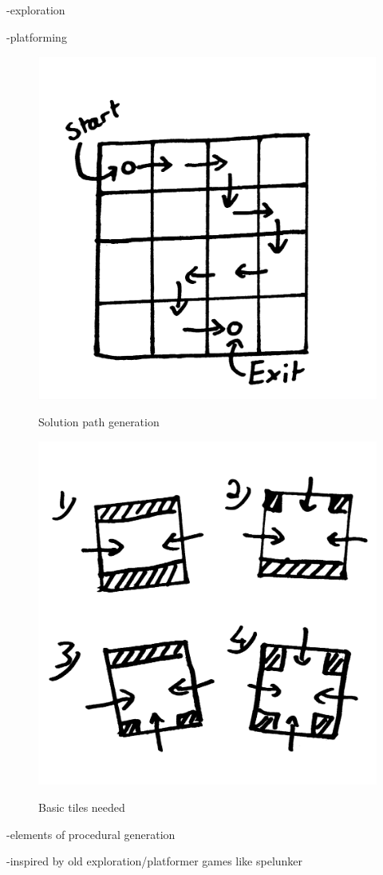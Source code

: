 -exploration

-platforming

\begin{figure}
\centering
\includegraphics[scale=0.2, trim = 0cm 0cm 0cm 0cm]{images/4x4}
\label{fig:4x}
\caption{Solution path generation}
\end{figure}

\begin{figure}
\centering
\includegraphics[scale=0.2, trim = 0cm 0cm 0cm 0cm]{images/16x16}
\label{fig:16x}
\caption{Basic tiles needed}
\end{figure}

-elements of procedural generation

-inspired by old exploration/platformer games like spelunker